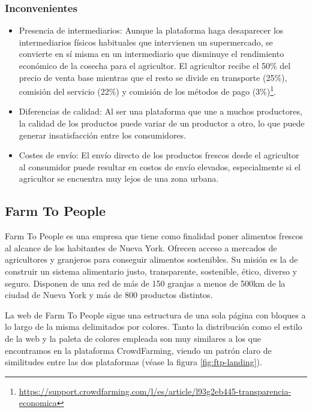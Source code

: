 \subsubsection{Inconvenientes}

\begin{itemize}

	\item Presencia de intermediarios: Aunque la plataforma haga desaparecer los intermediarios físicos habituales que intervienen un supermercado, se convierte en sí misma en un intermediario que disminuye el rendimiento económico de la cosecha para el agricultor. El agricultor recibe el 50\% del precio de venta base mientras que el resto se divide en transporte (25\%), comisión del servicio (22\%) y comisión de los métodos de pago (3\%)\footnote{\url{https://support.crowdfarming.com/l/es/article/l93g2eb445-transparencia-economica}}.

	\item Diferencias de calidad: Al ser una plataforma que une a muchos productores, la calidad de los productos puede variar de un productor a otro, lo que puede generar insatisfacción entre los consumidores.

	\item Costes de envío: El envío directo de los productos frescos desde el agricultor al consumidor puede resultar en costos de envío elevados, especialmente si el agricultor se encuentra muy lejos de una zona urbana.

\end{itemize}

\subsection{Farm To People}

Farm To People es una empresa que tiene como finalidad poner alimentos frescos al alcance de los habitantes de Nueva York. Ofrecen acceso a mercados de agricultores y granjeros para conseguir alimentos sostenibles. Su misión es la de construir un sistema alimentario justo, transparente, sostenible, ético, diverso y seguro. Disponen de una red de más de 150 granjas a menos de 500km de la ciudad de Nueva York y más de 800 productos distintos.

La web de Farm To People sigue una estructura de una sola página con bloques a lo largo de la misma delimitados por colores. Tanto la distribución como el estilo de la web y la paleta de colores empleada son muy similares a los que encontramos en la plataforma CrowdFarming, viendo un patrón claro de similitudes entre las dos plataformas (véase la figura \ref{fig:ftp-landing}).

